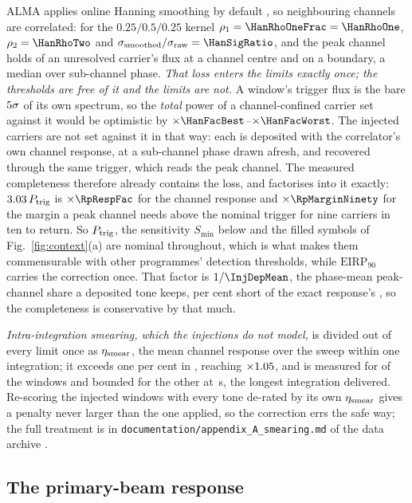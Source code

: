 ALMA applies online Hanning smoothing by default \citep{ALMAHandbook}, so
neighbouring channels are correlated: for the $0.25/0.5/0.25$ kernel
$\rho_1=\HanRhoOneFrac=\HanRhoOne$, $\rho_2=\HanRhoTwo$ and
$\sigma_{\rm smoothed}/\sigma_{\rm raw}=\HanSigRatio$, and the peak
channel holds \HanBest{} of an unresolved carrier's flux at a channel centre
and \HanWorst{} on a boundary, a median \HanMed{} over sub-channel phase.
\emph{That loss enters the limits exactly once; the thresholds are free of it
and the limits are not.} A window's trigger flux is the bare
$5\sigma$ of its own spectrum, so the \emph{total} power of a
channel-confined carrier set against it would be optimistic by
$\times\HanFacBest$--$\times\HanFacWorst$. The injected carriers are not set
against it in that way: each is deposited with the correlator's own channel
response, at a sub-channel phase drawn afresh, and recovered through the same
trigger, which reads the peak channel. The measured completeness therefore
already contains the loss, and factorises into it exactly:
$3.03\,P_{\rm trig}$ is $\times\RpRespFac$ for the channel
response and $\times\RpMarginNinety$ for the margin a peak channel needs
above the nominal trigger for nine carriers in ten to return. So
$P_{\rm trig}$, the sensitivity $S_{\min}$ below and the filled symbols of
Fig.~\ref{fig:context}(a) are nominal throughout, which is what makes them
commensurable with other programmes' detection thresholds, while
$\mathrm{EIRP}_{90}$ carries the correction once.
That factor is $1/\InjDepMean$, the phase-mean peak-channel share a deposited
tone keeps, \InjShortPct{} per cent short of the exact response's
\InjRespMean{}, so the completeness is conservative by that much.

\emph{Intra-integration smearing, which the injections do not model,} is
divided out of every limit once as $\eta_{\rm smear}$, the mean channel
response over the sweep within one integration; it exceeds one per cent in
\NmRespNApplied, reaching $\times1.05$, and is measured for
\SmcNMeas{} of the \NWindows{} windows and bounded for the other \SmcNBound{}
at \SmcDtCeil\,s, the longest integration delivered. Re-scoring the
\SmcValNWin{} injected windows with every tone de-rated by its own
$\eta_{\rm smear}$ gives a penalty never larger than the one applied, so the
correction errs the safe way; the full treatment is in
\texttt{documentation/\allowbreak appendix\_A\_smearing.md} of the data archive
\citep{SIdeposit}.

\subsection{The primary-beam response}
\label{app:pbresp}

